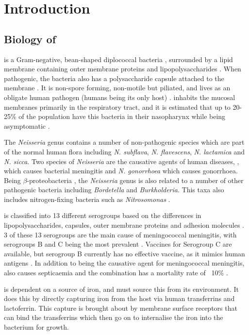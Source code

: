 \chapter{Introduction}

\section{Biology of \Nsm{}}
\Nsm{} is a Gram-negative, bean-shaped diplococcal bacteria \cite{Deuren2000}, surrounded by a lipid membrane containing outer membrane proteins and lipopolysaccharides \cite{Deuren2000}. When pathogenic, the bacteria also has a polysaccharide capsule attached to the membrane \cite{Deuren2000}. It is non-spore forming, non-motile but piliated, and lives as an obligate human pathogen (humans being its only host) \cite{Stephens2009}. \Nm{} inhabits the mucosal membranes primarily in the respiratory tract, and it is estimated that up to 20-25\% of the population have this bacteria in their nasopharynx while being asymptomatic \cite{Rosenstein2001,Stephens2009,DeVoe1982}.

The \textit{Neisseria} genus contains a number of non-pathogenic species which are part of the normal human flora including \textit{N. subflava},  \textit{N. flavescens},  \textit{N. lactamica} and \textit{N. sicca}\cite{Aas2005}. Two species of \textit{Neisseria} are the causative agents of human diseases, \Nm{}, which causes bacterial meningitis and \textit{N. gonorrhoea} which causes gonorrhoea. Being $\beta$-proteobacteria \cite{Stephens2009}, the \textit{Neisseria} genus is also related to a number of other pathogenic bacteria including \textit{Bordetella} and \textit{Burkholderia}. This taxa also includes nitrogen-fixing bacteria such as \textit{Nitrosomonas} \cite{Madigan2005}.

\Nm{} is classified into 13 different serogroups based on the differences in lipopolysaccharides, capsules, outer membrane proteins and adhesion molecules \cite{Stephens2009,Deuren2000,Carbonnelle2009}. 3 of these 13 serogroups are the main cause of meningococcal meningitis, with serogroups B and C being the most prevalent \cite{Deuren2000}. Vaccines for Serogroup C are available, but serogroup B currently has no effective vaccine, as it mimics human antigens \cite{Stephens2009}. In addition to being the causative agent for meningococcal meningitis, \Nm{} also causes septicaemia and the combination has a mortality rate of ~10\% \cite{Deuren2000,Stephens2009}.

\Nm{} is dependent on a source of iron, and must source this from its environment\cite{Larson2002}. It does this by directly capturing iron from the host via human transferrins\cite{Archibald1978,Perkins-Balding2004,Larson2002} and lactoferrin\cite{Larson2002}. This capture is brought about by membrane surface receptors that can bind the transferrins which then go on to internalise the iron into the bacterium for growth\cite{Yazdankhah2004}.

